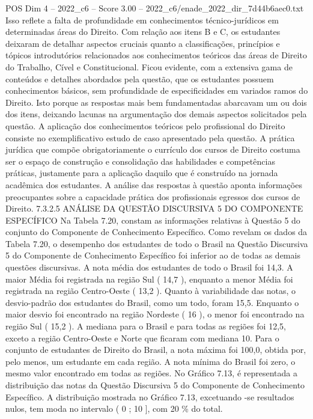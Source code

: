 \begin{textsample}{POS Dim 4 – 2022\_c6 – Score 3.00 – 2022\_c6/enade\_2022\_dir\_7d44b6aec0.txt}
Isso reflete a falta de profundidade em conhecimentos técnico-jurídicos em determinadas áreas do Direito.
Com relação aos itens B e C, os estudantes deixaram de detalhar aspectos cruciais quanto a classificações, princípios e tópicos introdutórios relacionados aos conhecimentos teóricos das áreas de Direito do Trabalho, Cível e Constitucional.
Ficou evidente, com a extensiva gama de conteúdos e detalhes abordados pela questão, que os estudantes possuem conhecimentos básicos, sem profundidade de especificidades em variados ramos do Direito.
Isto porque as respostas mais bem fundamentadas abarcavam um ou dois dos itens, deixando lacunas na argumentação dos demais aspectos solicitados pela questão.
A aplicação dos conhecimentos teóricos pelo profissional do Direito consiste no exemplificativo estudo de caso apresentado pela questão.
A prática jurídica que compõe obrigatoriamente o currículo dos cursos de Direito costuma ser o espaço de construção e consolidação das habilidades e competências práticas, justamente para a aplicação daquilo que é construído na jornada acadêmica dos estudantes.
A análise das respostas à questão aponta informações preocupantes sobre a capacidade prática dos profissionais egressos dos cursos de Direito. 7.3.2.5 ANÁLISE DA QUESTÃO DISCURSIVA 5 DO COMPONENTE ESPECÍFICO Na Tabela 7.20, constam as informações relativas à Questão 5 do conjunto do Componente de Conhecimento Específico.
Como revelam os dados da Tabela 7.20, o desempenho dos estudantes de todo o Brasil na Questão Discursiva 5 do Componente de Conhecimento Específico foi inferior ao de todas as demais questões discursivas.
A nota média dos estudantes de todo o Brasil foi 14,3.
A maior Média foi registrada na região Sul ( 14,7 ), enquanto a menor Média foi registrada na região Centro-Oeste ( 13,2 ).
Quanto à variabilidade das notas, o desvio-padrão dos estudantes do Brasil, como um todo, foram 15,5.
Enquanto o maior desvio foi encontrado na região Nordeste ( 16 ), o menor foi encontrado na região Sul ( 15,2 ).
A mediana para o Brasil e para todas as regiões foi 12,5, exceto a região Centro-Oeste e Norte que ficaram com mediana 10.
Para o conjunto de estudantes de Direito do Brasil, a nota máxima foi 100,0, obtida por, pelo menos, um estudante em cada região.
A nota mínima do Brasil foi zero, o mesmo valor encontrado em todas as regiões.
No Gráfico 7.13, é representada a distribuição das notas da Questão Discursiva 5 do Componente de Conhecimento Específico.
A distribuição mostrada no Gráfico 7.13, excetuando -se resultados nulos, tem moda no intervalo ( 0 ; 10 ], com 20 \% do total.

\end{textsample}
